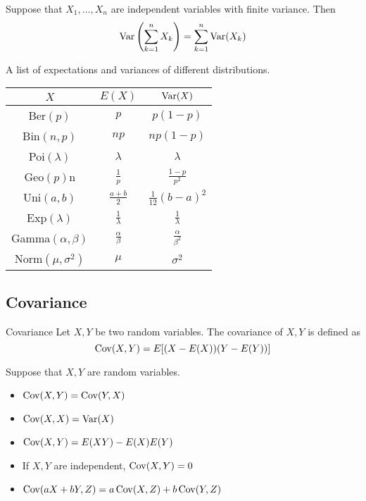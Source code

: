 \documentclass[a4paper]{article}
\begin{document}
\begin{thm}{}{} Suppose that $X_1,\dots,X_n$ are independent variables with finite variance. Then $$\operatorname{Var}\left(\sum_{k=1}^nX_k\right)=\sum_{k=1}^n\operatorname{Var}(X_k)$$
\end{thm}

\begin{thm}{}{} A list of expectations and variances of different distributions. \begin{center}
\begin{tabular}{ |c|c|c| } 
\hline
$X$&$E(X)$&$\operatorname{Var}(X)$\\\hline
Ber$(p)$&$p$&$p(1-p)$\\\hline
Bin$(n,p)$&$np$&$np(1-p)$\\\hline
Poi$(\lambda)$&$\lambda$&$\lambda$\\\hline
Geo$(p)$n&$\frac{1}{p}$&$\frac{1-p}{p^2}$\\\hline
Uni$(a,b)$&$\frac{a+b}{2}$&$\frac{1}{12}(b-a)^2$\\\hline
Exp$(\lambda)$&$\frac{1}{\lambda}$&$\frac{1}{\lambda}$\\\hline
Gamma$(\alpha,\beta)$&$\frac{\alpha}{\beta}$&$\frac{\alpha}{\beta^2}$\\\hline
Norm$(\mu,\sigma^2)$&$\mu$&$\sigma^2$\\\hline
\end{tabular}
\end{center}
\end{thm}

\subsection{Covariance}
\begin{defn}{Covariance}{} Let $X,Y$ be two random variables. The covariance of $X,Y$ is defined as $$\operatorname{Cov}(X,Y)=E[(X-E(X))(Y-E(Y))]$$
\end{defn}

\begin{prp}{}{} Suppose that $X,Y$ are random variables. 
\begin{itemize}
\item $\operatorname{Cov}(X,Y)=\operatorname{Cov}(Y,X)$
\item $\operatorname{Cov}(X,X)=\operatorname{Var}(X)$
\item $\operatorname{Cov}(X,Y)=E(XY)-E(X)E(Y)$
\item If $X,Y$ are independent, $\operatorname{Cov}(X,Y)=0$
\item $\operatorname{Cov}(aX+bY,Z)=a\operatorname{Cov}(X,Z)+b\operatorname{Cov}(Y,Z)$
\end{itemize}
\end{prp}
\end{document}
